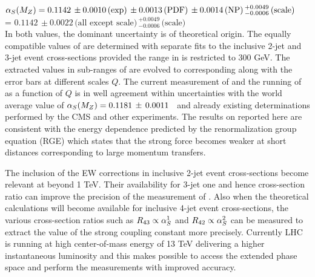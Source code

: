 $\alpha_S(M_Z) = 0.1142\,\pm0.0010\,\textrm{(exp)}\,\pm0.0013\,\textrm{(PDF)}\,\pm0.0014\,\textrm{(NP)}\,^{+0.0049}_{-0.0006}\,\textrm{(scale)}$ \\ \hspace*{24mm} = $0.1142\,\pm0.0022\,\textrm{(all except scale)}\,^{+0.0049}_{-0.0006}\,\textrm{(scale)}$\\ 
In both values, the dominant uncertainty is of theoretical origin. The equally compatible values of \alpsmz are determined with separate fits to the inclusive 2-jet and 3-jet event cross-sections provided the range in \httwo is restricted to 300 \ls \httwo {} GeV. The extracted \alpsmz values in sub-ranges of \httwo are evolved to corresponding \alpsq along with the error bars at different scales $Q$. The current measurement of \alpsmz and the running of \alpsq as a function of $Q$ is in well agreement within uncertainties with the world average value of $\alpha_S(M_Z) = 0.1181 \,\pm\, 0.0011$~\cite{Patrignani:2016xqp} and already existing determinations performed by the CMS and other experiments. The results on \alps reported here are consistent with the energy dependence predicted by the renormalization group equation (RGE) \cite{Callan:1970yg} which states that the strong force becomes weaker at short distances corresponding to large momentum transfers.

The inclusion of the EW corrections in inclusive 2-jet event cross-sections become relevant at \httwo beyond 1 TeV. Their availability for 3-jet one and hence cross-section ratio \ratio can improve the precision of the measurement of \alpsmz. Also when the theoretical calculations will become available for inclusive 4-jet event cross-sections, the various cross-section ratios such as $R_{\rm 43} \propto \alpha_S^1$ and $R_{\rm 42} \propto \alpha_S^2$ can be measured to extract the value of the strong coupling constant more precisely. Currently LHC is running at high center-of-mass energy of 13 TeV delivering a higher instantaneous luminosity and this makes possible to access the extended phase space and perform the measurements with improved accuracy.
